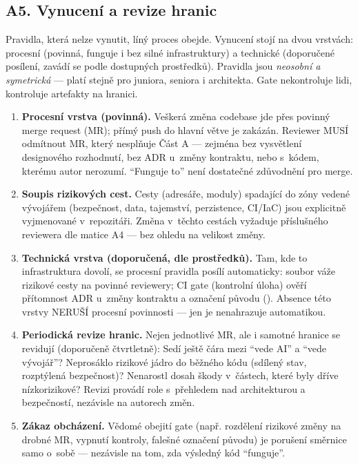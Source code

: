 \subsection{A5. Vynucení a revize hranic}

Pravidla, která nelze vynutit, líný proces obejde.
Vynucení stojí na dvou vrstvách: procesní (povinná, funguje i bez silné infrastruktury) a technické (doporučené posílení, zavádí se podle dostupných prostředků).
Pravidla jsou \emph{neosobní a symetrická} --- platí stejně pro juniora, seniora i architekta. Gate nekontroluje lidi, kontroluje artefakty na hranici.

\begin{enumerate}[label=\textbf{A5.\arabic*}]
\item \textbf{Procesní vrstva (povinná).}
Veškerá změna codebase jde přes povinný merge request (MR); přímý push do hlavní větve je zakázán.
Reviewer MUSÍ odmítnout MR, který nesplňuje Část A --- zejména bez vysvětlení designového rozhodnutí, bez ADR u~změny kontraktu, nebo s~kódem, kterému autor nerozumí.
\enquote{Funguje to} není dostatečné zdůvodnění pro merge.
\item \textbf{Soupis rizikových cest.}
Cesty (adresáře, moduly) spadající do zóny vedené vývojářem (bezpečnost, data, tajemství, perzistence, CI/IaC) jsou explicitně vyjmenované v~repozitáři.
Změna v~těchto cestách vyžaduje příslušného reviewera dle matice A4 --- bez ohledu na velikost změny.
\item \textbf{Technická vrstva (doporučená, dle prostředků).}
Tam, kde to infrastruktura dovolí, se procesní pravidla posílí automaticky:
soubor  váže rizikové cesty na povinné reviewery;
CI gate (kontrolní úloha) ověří přítomnost ADR u~změny kontraktu a označení původu (\code{[ai-generated]}).
Absence této vrstvy NERUŠÍ procesní povinnosti --- jen je nenahrazuje automatikou.
\item \textbf{Periodická revize hranic.}
Nejen jednotlivé MR, ale i samotné hranice se revidují (doporučeně čtvrtletně):
Sedí ještě čára mezi \enquote{vede AI} a \enquote{vede vývojář}?
Neprosáklo rizikové jádro do běžného kódu (sdílený stav, rozptýlená bezpečnost)?
Nenarostl dosah škody v~částech, které byly dříve nízkorizikové?
Revizi provádí role s~přehledem nad architekturou a bezpečností, nezávisle na autorech změn.
\item \textbf{Zákaz obcházení.}
Vědomé obejití gate (např. rozdělení rizikové změny na drobné MR, vypnutí kontroly, falešné označení původu) je porušení směrnice samo o~sobě --- nezávisle na tom, zda výsledný kód \enquote{funguje}.
\end{enumerate}

